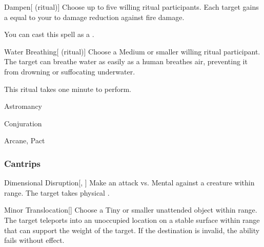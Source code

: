 \lowercase{\hypertarget{spell:Dampen}{}}\label{spell:Dampen}
\begin{attuneability}[\nth{1}]{\hypertarget{spell:Dampen}{Dampen}}[ (ritual)]
Choose up to five willing ritual participants.
Each target gains a  equal to your  to damage reduction against fire damage.

You can cast this spell as a .
\end{attuneability}
\vspace{0.25em}



\lowercase{\hypertarget{spell:Water Breathing}{}}\label{spell:Water Breathing}
\begin{attuneability}[\nth{2}]{\hypertarget{spell:Water Breathing}{Water Breathing}}[ (ritual)]
Choose a Medium or smaller willing ritual participant.
The target can breathe water as easily as a human breathes air, preventing it from drowning or suffocating underwater.

This ritual takes one minute to perform.
\end{attuneability}
\vspace{0.25em}


\newpage
\begin{spellsection}{Astromancy}

\begin{spellheader}
\end{spellheader}


 Conjuration

 Arcane, Pact

\subsubsection{Cantrips}


\begin{freeability}{Dimensional Disruption}[, ]
Make an attack vs. Mental against a creature within \rngmed range.
\hit The target takes physical .
\end{freeability}


\begin{freeability}{Minor Translocation}[]
Choose a Tiny or smaller unattended object within \rngclose range.
The target teleports into an unoccupied location on a stable surface within range that can support the weight of the target.
If the destination is invalid, the ability fails without effect.
\end{freeability}

\end{spellsection}


